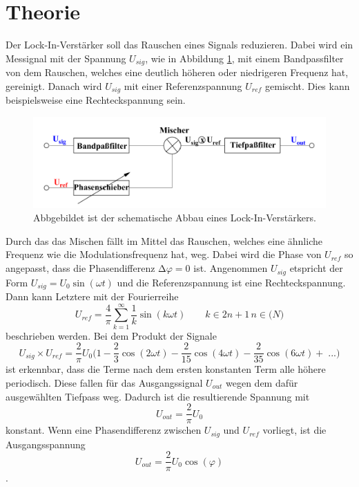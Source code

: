 \section{Theorie \cite{V303}}
\label{sec:Theorie}

Der Lock-In-Verstärker soll das Rauschen eines Signals reduzieren.
Dabei wird ein Messignal mit der Spannung $U_{sig}$, wie in Abbildung \ref{fig:schema}, mit einem Bandpassfilter von dem Rauschen, welches eine deutlich höheren oder niedrigeren Frequenz hat, gereinigt.
Danach wird $U_{sig}$ mit einer Referenzspannung $U_{ref}$ gemischt.
Dies kann beispielsweise eine Rechteckspannung sein.


\begin{figure}[H]
    \caption{Abbgebildet ist der schematische Abbau eines Lock-In-Verstärkers.}
    \label{fig:schema}
    \includegraphics{Bilder/schema.png}
\end{figure}

Durch das das Mischen fällt im Mittel das Rauschen, welches eine ähnliche Frequenz wie die Modulationsfrequenz hat, weg.
Dabei wird die Phase von $U_{ref}$ so angepasst, dass die Phasendifferenz $\increment \varphi=0$ ist.
Angenommen $U_{sig}$ etspricht der Form $U_{sig}=U_0 \sin(\omega t)$ und die Referenzspannung ist eine Rechteckspannung.
Dann kann Letztere mit der Fourierreihe 
\begin{equation}
    U_{ref}=\frac{4}{\pi} \sum_{k=1}^\infty \frac{1}{k}\sin(k\omega t) \qquad k \in 2n+1 \, n \in \mathbb(N)
    \label{eqn:Fourier}
\end{equation}
beschrieben werden.
Bei dem Produkt der Signale 
\begin{equation}
    U_{sig} \times U_{ref}=\frac{2}{\pi}U_0 \biggl(1-\frac{2}{3}\cos(2\omega t)-\frac{2}{15}\cos(4\omega t)- \frac{2}{35}\cos(6 \omega t)+ \; ...\biggr)
    \label{eqn:Produkt}
\end{equation}
ist erkennbar, dass die Terme nach dem ersten konstanten Term alle höhere periodisch.
Diese fallen für das Ausgangssignal $U_{out}$ wegen dem dafür ausgewählten Tiefpass weg.
Dadurch ist die resultierende Spannung mit
\begin{equation}
    U_{out}=\frac{2}{\pi}U_0
    \label{eqn:konst}
\end{equation}
konstant.
Wenn eine Phasendifferenz zwischen $U_{sig}$ und $U_{ref}$ vorliegt, ist die Ausgangsspannung 
\begin{equation}
    U_{out}=\frac{2}{\pi}U_0 \cos(\varphi)
    \label{eqn:cos}
\end{equation}.
